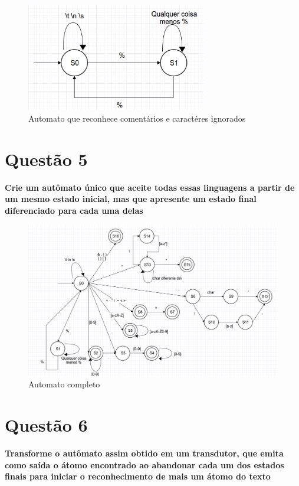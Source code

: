 \documentclass[
	article,			%
	11pt,				%
	oneside,			%
	a4paper,			%
	english,			%
	brazil,				%
	]{abntex2}
\begin{document}
\begin{figure}[H]
  \caption{Automato que reconhece comentários e caractéres ignorados}
  \centering
    \includegraphics[width=0.7\textwidth]{automatos/non-used}
\end{figure}

\section{Questão 5}

\textbf{Crie um autômato único que aceite todas essas linguagens a partir de um mesmo estado inicial, mas que apresente um estado final diferenciado para cada uma delas}

\begin{figure}[H]
  \caption{Automato completo}
  \centering
    \includegraphics[width=\textwidth]{automatos/completo}
\end{figure}

\section{Questão 6}

\textbf{Transforme o autômato assim obtido em um transdutor, que emita como saída o átomo encontrado ao abandonar cada um dos estados finais para iniciar o reconhecimento de mais um átomo do texto}
\end{document}
